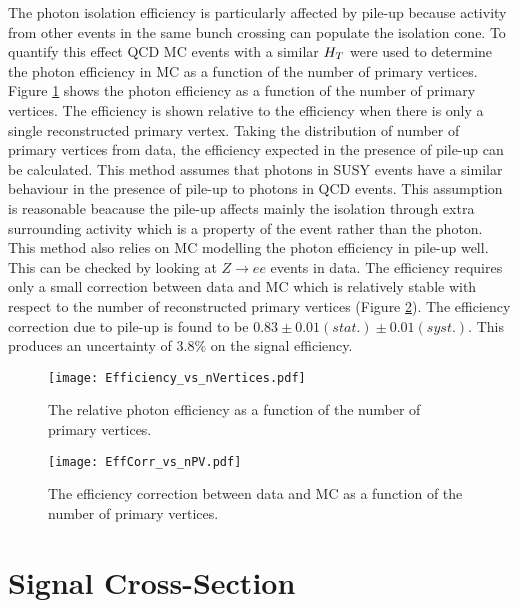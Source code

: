 The photon isolation efficiency is particularly affected by pile-up because
activity from other events in the same bunch crossing can populate the isolation
cone. To quantify this effect QCD MC events with a similar $H_{T}$ were used to
determine the photon efficiency in MC as a function of the number of primary
vertices. Figure \ref{fig:Efficiency_vs_nVertices} shows the photon efficiency
as a function of the number of primary vertices. The efficiency is shown
relative to the efficiency when there is only a single reconstructed primary
vertex. Taking the distribution of number of primary vertices from data, the 
efficiency expected in the presence of pile-up can be calculated. This method 
assumes that photons in SUSY events have a similar behaviour in the presence of 
pile-up to photons in QCD events. This assumption is reasonable beacause the 
pile-up affects mainly the isolation through extra surrounding activity which is 
a property of the event rather than the photon. This method also relies on MC 
modelling the photon efficiency in pile-up well. This can be checked by looking 
at $Z\rightarrow ee$ events in data. The efficiency requires only a small 
correction between data and MC which is relatively stable with respect to the
number of reconstructed primary vertices (Figure \ref{fig:EffCorr_vs_nPV}). The 
efficiency correction due to pile-up is found to be 
$0.83\pm0.01(stat.)\pm0.01(syst.)$. This produces an uncertainty of 
$3.8\unit{\%}$ on the signal efficiency.

\begin{figure}
\begin{center}
\texttt{[image: Efficiency\_vs\_nVertices.pdf]}
\end{center}
\caption{The relative photon efficiency as a function of the number of primary 
vertices.}
\label{fig:Efficiency_vs_nVertices}
\end{figure}

\begin{figure}
\begin{center}
\texttt{[image: EffCorr\_vs\_nPV.pdf]}
\end{center}
\caption{The efficiency correction between data and MC as a function of the
number of primary vertices.}
\label{fig:EffCorr_vs_nPV}
\end{figure}

\section{Signal Cross-Section}
\label{sec:xsec}

